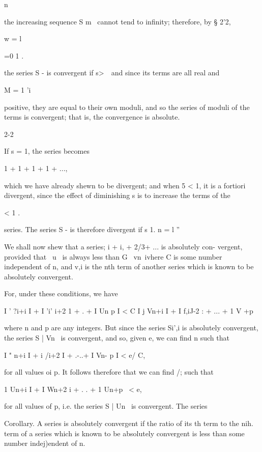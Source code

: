 n

the increasing sequence S m~ cannot tend to infinity; therefore, by §
2'2,

w = l

=0 1 .

the series S - is convergent if s>\ \ and since its terms are all real
and

M = 1 'i

positive, they are equal to their own moduli, and so the series of
moduli of the terms is convergent; that is, the convergence is
absolute.

2-2

%
%

If s = 1, the series becomes

1 + 1 + 1 + 1 + ...,

which we have already shewn to be divergent; and when 5 < 1, it is a
fortiori divergent, since the effect of diminishing s is to increase
the terms of the

< 1 .

series. The series S - is therefore divergent if s 1. n = l ''


We shall now shew that a series; i + i, + 2/3+ ... is absolutely
con- vergent, provided that \ u \ is always less than G \ vn\, ivhere
C is some number independent of n, and v,i is the nth term of another
series which is known to be absolutely convergent.

For, under these conditions, we have

I ' ?i+i I + I 'i' i+2 1 +  .  + I Un p I < C I j Vn+i I + I f,iJ-2
: + ... + 1 V +p \ \,

where n and p are any integers. But since the series Si',i is
absolutely convergent, the series S | Vn \ is convergent, and so,
given e, we can find n such that

I " n+i I + i /i+2 I + .-..+ I Vn- p I < e/ C,

for all values oi p. It follows therefore that we can find /; such
that

1 Un+i I + I Wn+2 i + . . + 1 Un+p \ < e,

for all values of p, i.e. the series S | Un \ is convergent. The
series %

Corollary. A series is absolutely convergent if the ratio of its th
term to the nih. term of a series which is known to be absolutely
convergent is less than some number indej)endent of n.

